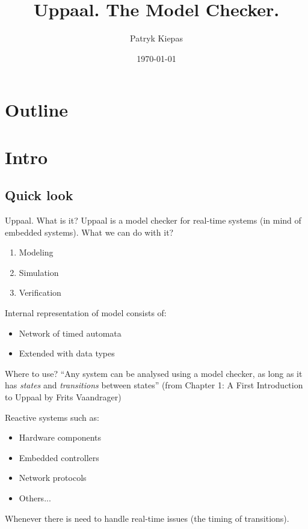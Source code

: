 \documentclass{beamer}
\title{Uppaal. The Model Checker.}
\author{Patryk Kiepas}
\date{\today}
\begin{document}
\begin{frame}
	\titlepage
\end{frame}

\section*{Outline}
\begin{frame}
	\tableofcontents
\end{frame}

\section{Intro}
\subsection{Quick look}
\begin{frame}{Uppaal. What is it?}
	Uppaal is a model checker for real-time systems (in mind of embedded systems). What we can do with it?
	
	\begin{enumerate}
		\item Modeling
		\item Simulation
		\item Verification
	\end{enumerate}
	
	Internal representation of model consists of:
	
	\begin{itemize}
		\item Network of timed automata
		\item Extended with data types
	\end{itemize}

\end{frame}

\begin{frame}{Where to use?}
	``Any system can be analysed using a model checker, as long as it has \textit{states} and \textit{transitions} between states'' (from Chapter 1: A First Introduction to Uppaal by Frits Vaandrager) \newline
	
	Reactive systems such as:
	\begin{itemize}
		\item Hardware components
		\item Embedded controllers
		\item Network protocols
		\item Others...
	\end{itemize}
	Whenever there is need to handle real-time issues (the timing of transitions).
	
\end{frame}
\end{document}
